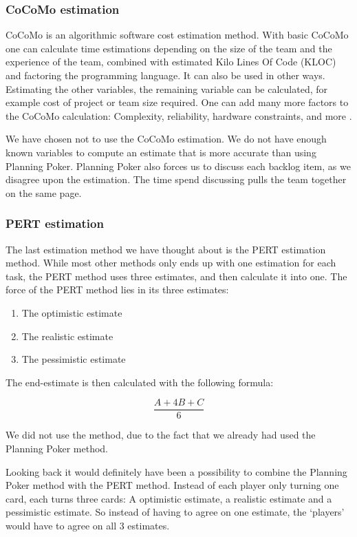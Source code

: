 \subsubsection{CoCoMo estimation}
CoCoMo is an algorithmic software cost estimation method. With basic CoCoMo one can calculate time estimations depending on the size of the team and the experience of the team, combined with estimated Kilo Lines Of Code (KLOC) and factoring the programming language. It can also be used in other ways. Estimating the other variables, the remaining variable can be calculated, for example cost of project or team size required. One can add many more factors to the CoCoMo calculation: Complexity, reliability, hardware constraints, and more \textbf{\cite[p. ?]{?}}.

We have chosen not to use the CoCoMo estimation. We do not have enough known variables to compute an estimate that is more accurate than using Planning Poker. Planning Poker also forces us to discuss each backlog item, as we disagree upon the estimation. The time spend discussing pulls the team together on the same page. 

\subsubsection{PERT estimation}
The last estimation method we have thought about is the PERT estimation method. While most other methods only ends up with one estimation for each task, the PERT method uses three estimates, and then calculate it into one. The force of the PERT method lies in its three estimates:

\begin{enumerate}[label=\Alph{*}\hspace{0.8em}]
	\item The optimistic estimate
	\item The realistic estimate
	\item The pessimistic estimate
\end{enumerate}

The end-estimate is then calculated with the  following formula:

\begin{equation}
	\frac{A+4B+C}{6}
\end{equation}

We did not use the method, due to the fact that we already had used the Planning Poker method.

Looking back it would definitely have been a possibility to combine the Planning Poker method with the PERT method. Instead of each player only turning one card, each turns three cards: A optimistic estimate, a realistic estimate and a pessimistic estimate. So instead of having to agree on one estimate, the `players' would have to agree on all 3 estimates.